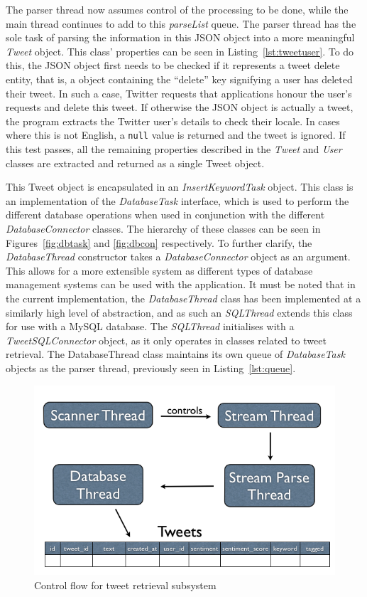 The parser thread now assumes control of the processing to be done, while the main thread continues to add to this \emph{parseList} queue. The parser thread has the sole task of parsing the information in this JSON object into a more meaningful \emph{Tweet} object. This class' properties can be seen in Listing~\ref{lst:tweetuser}. To do this, the JSON object first needs to be checked if it represents a tweet delete entity, that is, a object containing the ``delete'' key signifying a user has deleted their tweet. In such a case, Twitter requests that applications honour the user's requests and delete this tweet. If otherwise the JSON object is actually a tweet, the program extracts the Twitter user's details to check their locale. In cases where this is not English, a \texttt{null} value is returned and the tweet is ignored. If this test passes, all the remaining properties described in the \emph{Tweet} and \emph{User} classes are extracted and returned as a single Tweet object.

This Tweet object is encapsulated in an \emph{InsertKeywordTask} object. This class is an implementation of the \emph{DatabaseTask} interface, which is used to perform the different database operations when used in conjunction with the different \emph{DatabaseConnector} classes. The hierarchy of these classes can be seen in Figures~\ref{fig:dbtask} and \ref{fig:dbcon} respectively. To further clarify, the \emph{DatabaseThread} constructor takes a \emph{DatabaseConnector} object as an argument. This allows for a more extensible system as different types of database management systems can be used with the application. It must be noted that in the current implementation, the \emph{DatabaseThread} class has been implemented at a similarly high level of abstraction, and as such an \emph{SQLThread} extends this class for use with a MySQL database. The \emph{SQLThread} initialises with a \emph{TweetSQLConnector} object, as it only operates in classes related to tweet retrieval. The DatabaseThread class maintains its own queue of \emph{DatabaseTask} objects as the parser thread, previously seen in Listing~\ref{lst:queue}.

\begin{figure}[t]
\begin{center}
\includegraphics[width=12cm]{tweetir}
\end{center}
\caption{Control flow for tweet retrieval subsystem}
\label{fig:tweetir}
\end{figure}

